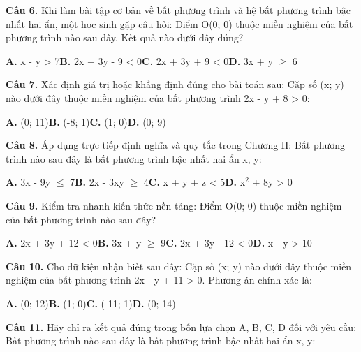 \documentclass[11pt,a4paper]{article}
\begin{document}
\textbf{\color{primary} Câu 6.} Khi làm bài tập cơ bản về bất phương trình và hệ bất phương trình bậc nhất hai ẩn, một học sinh gặp câu hỏi: Điểm O(0; 0) thuộc miền nghiệm của bất phương trình nào sau đây. Kết quả nào dưới đây đúng?\par
\hspace*{1.5em}\textbf{A.} x - y > 7\quad\quad \textbf{B.} 2x + 3y - 9 < 0\quad\quad \textbf{C.} 2x + 3y + 9 < 0\quad\quad \textbf{D.} 3x + y $\ge$ 6\par\vspace{2pt}
\textbf{\color{primary} Câu 7.} Xác định giá trị hoặc khẳng định đúng cho bài toán sau: Cặp số (x; y) nào dưới đây thuộc miền nghiệm của bất phương trình 2x - y + 8 > 0:\par
\hspace*{1.5em}\textbf{A.} (0; 11)\quad\quad \textbf{B.} (-8; 1)\quad\quad \textbf{C.} (1; 0)\quad\quad \textbf{D.} (0; 9)\par\vspace{2pt}
\textbf{\color{primary} Câu 8.} Áp dụng trực tiếp định nghĩa và quy tắc trong Chương II: Bất phương trình nào sau đây là bất phương trình bậc nhất hai ẩn x, y:\par
\hspace*{1.5em}\textbf{A.} 3x - 9y $\le$ 7\quad\quad \textbf{B.} 2x - 3xy $\ge$ 4\quad\quad \textbf{C.} x + y + z < 5\quad\quad \textbf{D.} x$^2$ + 8y > 0\par\vspace{2pt}
\textbf{\color{primary} Câu 9.} Kiểm tra nhanh kiến thức nền tảng: Điểm O(0; 0) thuộc miền nghiệm của bất phương trình nào sau đây?\par
\hspace*{1.5em}\textbf{A.} 2x + 3y + 12 < 0\quad\quad \textbf{B.} 3x + y $\ge$ 9\quad\quad \textbf{C.} 2x + 3y - 12 < 0\quad\quad \textbf{D.} x - y > 10\par\vspace{2pt}
\textbf{\color{primary} Câu 10.} Cho dữ kiện nhận biết sau đây: Cặp số (x; y) nào dưới đây thuộc miền nghiệm của bất phương trình 2x - y + 11 > 0. Phương án chính xác là:\par
\hspace*{1.5em}\textbf{A.} (0; 12)\quad\quad \textbf{B.} (1; 0)\quad\quad \textbf{C.} (-11; 1)\quad\quad \textbf{D.} (0; 14)\par\vspace{2pt}
\textbf{\color{primary} Câu 11.} Hãy chỉ ra kết quả đúng trong bốn lựa chọn A, B, C, D đối với yêu cầu: Bất phương trình nào sau đây là bất phương trình bậc nhất hai ẩn x, y:\par
\end{document}
